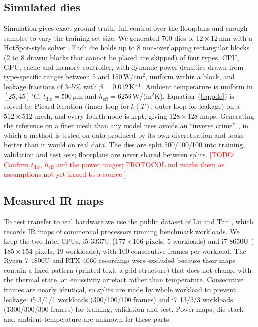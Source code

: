 \documentclass[journal]{IEEEtran}
\newcommand{\todo}[1]{\textcolor{red}{[TODO: #1]}}
\begin{document}
\subsection{Simulated dies}
Simulation gives exact ground truth, full control over the floorplans and enough samples to vary the training-set size.
We generated 700 dies of $12\times12$\,mm with a HotSpot-style solver \cite{huang2006hotspot}.
Each die holds up to 8 non-overlapping rectangular blocks (2 to 8 drawn; blocks that cannot be placed are skipped) of four types, CPU, GPU, cache and memory controller, with dynamic power densities drawn from type-specific ranges between 5 and 150\,W/cm$^2$, uniform within a block, and leakage fractions of 3--5\% with $\beta=0.012$\,K$^{-1}$.
Ambient temperature is uniform in $[25,45]\,^\circ$C, $t_\mathrm{die}=500\,\mu$m and $h_\mathrm{eff}=6256$\,W/(m$^2$K).
Equation~(\ref{eq:pde}) is solved by Picard iteration (inner loop for $k(T)$, outer loop for leakage) on a $512\times512$ mesh, and every fourth node is kept, giving $128\times128$ maps.
Generating the reference on a finer mesh than any model uses avoids an ``inverse crime'' \cite{wirgin2004inverse}, in which a method is tested on data produced by its own discretisation and looks better than it would on real data.
The dies are split 500/100/100 into training, validation and test sets; floorplans are never shared between splits.
\todo{Confirm $t_\mathrm{die}$, $h_\mathrm{eff}$ and the power ranges; PROTOCOL.md marks them as assumptions not yet traced to a source.}

\subsection{Measured IR maps}
To test transfer to real hardware we use the public dataset of Lu and Tan \cite{lu2024dataset}, which records IR maps of commercial processors running benchmark workloads.
We keep the two Intel CPUs, i5-3337U ($177\times166$ pixels, 5 workloads) and i7-8650U ($185\times154$ pixels, 19 workloads), with 100 consecutive frames per workload.
The Ryzen 7 4800U and RTX 4060 recordings were excluded because their maps contain a fixed pattern (printed text, a grid structure) that does not change with the thermal state, an emissivity artefact rather than temperature.
Consecutive frames are nearly identical, so splits are made by whole workload to prevent leakage: i5 3/1/1 workloads (300/100/100 frames) and i7 13/3/3 workloads (1300/300/300 frames) for training, validation and test.
Power maps, die stack and ambient temperature are unknown for these parts.
\end{document}
